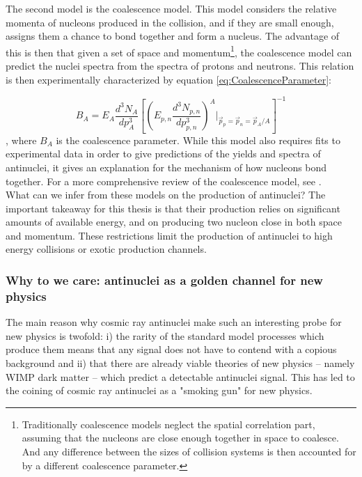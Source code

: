 The second model is the coalescence model. This model considers the relative momenta of nucleons produced in the collision, and if they are small enough, assigns them a chance to bond together and form a nucleus. The advantage of this is then that given a set of space and momentum\footnote{Traditionally coalescence models neglect the spatial correlation part, assuming that the nucleons are close enough together in space to coalesce. And any difference between the sizes of collision systems is then accounted for by a different coalescence parameter.}, the coalescence model can predict the nuclei spectra from the spectra of protons and neutrons. This relation is then experimentally characterized by equation \ref{eq:CoalescenceParameter}:

\begin{equation}\label{eq:CoalescenceParameter}
    B_A = E_A \frac{d^3 N_A}{dp^3_A} \left[ \left( E_{p,n} \frac{d^3 N_{p,n}}{dp^3_{p,n}} \right)^A |_{\vec{p}_p=\vec{p}_n=\vec{p}_A/A } \right]^{-1}
\end{equation}
, where $B_A$ is the coalescence parameter. While this model also requires fits to experimental data in order to give predictions of the yields and spectra of antinuclei, it gives an explanation for the mechanism of how nucleons bond together. For a more comprehensive review of the coalescence model, see \cite{Kachelriess:2020uoh, Coalescence2015}.\\

What can we infer from these models on the production of antinuclei? The important takeaway for this thesis is that their production relies on significant amounts of available energy, and on producing two nucleon close in both space and momentum. These restrictions limit the production of antinuclei to high energy collisions or exotic production channels.

\subsubsection{ Why to we care: antinuclei as a golden channel for new physics}\label{sec:Intro:AntinucleiGoldenChannel}
The main reason why cosmic ray antinuclei make such an interesting probe for new physics is twofold: i) the rarity of the standard model processes which produce them means that any signal does not have to contend with a copious background and ii) that there are already viable theories of new physics -- namely WIMP dark matter -- which predict a detectable antinuclei signal. This has led to the coining of cosmic ray antinuclei as a "smoking gun" for new physics. \\


